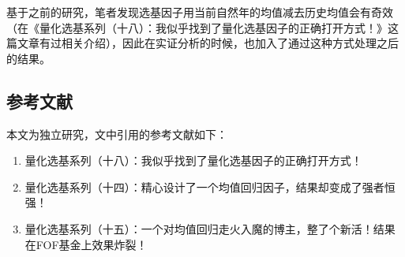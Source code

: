 \documentclass{article}
\begin{document}
基于之前的研究，笔者发现选基因子用当前自然年的均值减去历史均值会有奇效（在《量化选基系列（十八）：我似乎找到了量化选基因子的正确打开方式！》这篇文章有过相关介绍），因此在实证分析的时候，也加入了通过这种方式处理之后的结果。

\subsection{参考文献}
本文为独立研究，文中引用的参考文献如下：
\begin{enumerate}
    \item 量化选基系列（十八）：我似乎找到了量化选基因子的正确打开方式！
    \item 量化选基系列（十四）：精心设计了一个均值回归因子，结果却变成了强者恒强！
    \item 量化选基系列（十五）：一个对均值回归走火入魔的博主，整了个新活！结果在FOF基金上效果炸裂！
\end{enumerate}
\end{document}
